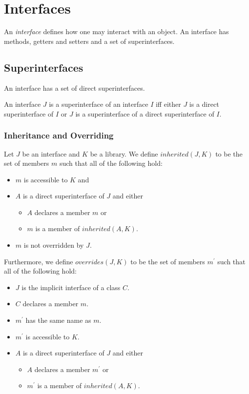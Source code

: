 \documentclass{article}
\begin{document}
\section{Interfaces}

\LMHash{}
An {\em interface} defines how one may interact with an object.
An interface has methods, getters and setters and a set of superinterfaces.


\subsection{Superinterfaces}

\LMHash{}
An interface has a set of direct superinterfaces.

\LMHash{}
An interface $J$ is a superinterface of an interface $I$ if{}f either $J$ is a direct superinterface of $I$ or $J$ is a superinterface of a direct superinterface of $I$.


\subsubsection{Inheritance and Overriding}

\LMHash{}
Let $J$ be an interface and $K$ be a library.
We define $inherited(J, K)$ to be the set of members $m$ such that all of the following hold:
\begin{itemize}
\item $m$ is accessible to $K$ and
\item $A$ is a direct superinterface of $J$ and either
  \begin{itemize}
  \item $A$ declares a member $m$ or
  \item $m$ is a member of $inherited(A, K)$.
  \end{itemize}
\item $m$ is not overridden by $J$.
\end{itemize}

\LMHash{}
Furthermore, we define $overrides(J, K)$ to be the set of members $m^\prime$ such that all of the following hold:
\begin{itemize}
\item $J$ is the implicit interface of a class $C$.
\item $C$ declares a member $m$.
\item $m^\prime$ has the same name as $m$.
\item $m^\prime$ is accessible to $K$.
\item $A$ is a direct superinterface of $J$ and either
  \begin{itemize}
  \item $A$ declares a member $m^\prime$ or
  \item $m^\prime$ is a member of $inherited(A, K)$.
  \end{itemize}
\end{itemize}
\end{document}
